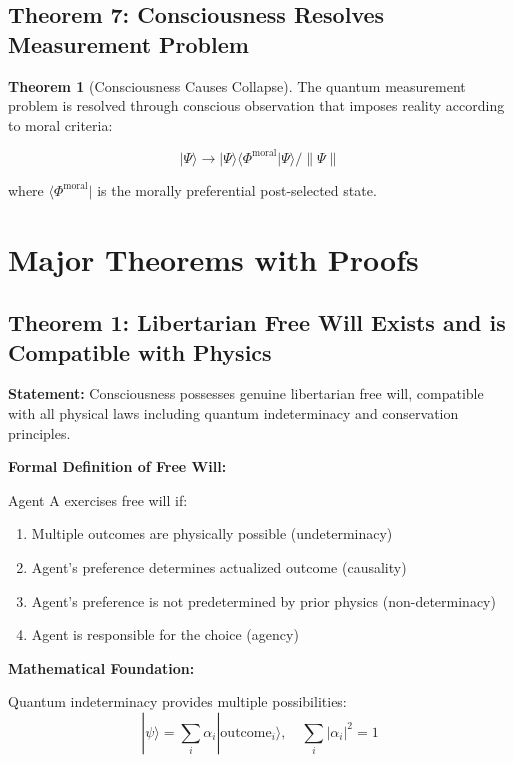 \documentclass[12pt,a4paper]{article}
\theoremstyle{definition}
\newtheorem{theorem}{Theorem}[section]
\begin{document}
\subsection{Theorem 7: Consciousness Resolves Measurement Problem}

\begin{theorem}[Consciousness Causes Collapse]
The quantum measurement problem is resolved through conscious observation that imposes reality according to moral criteria:

\begin{equation}
|\Psi\rangle \rightarrow |\Psi\rangle\langle\Phi^\text{moral}|\Psi\rangle / \| \Psi \|
\end{equation}

where $\langle\Phi^\text{moral}|$ is the morally preferential post-selected state.
\end{theorem}

\section{Major Theorems with Proofs}

\subsection{Theorem 1: Libertarian Free Will Exists and is Compatible with Physics}
{\bf Statement:} Consciousness possesses genuine libertarian free will, compatible with all physical laws including quantum indeterminacy and conservation principles.

{\bf Formal Definition of Free Will:}

Agent A exercises free will if:
\begin{enumerate}
    \item Multiple outcomes are physically possible (undeterminacy)
    \item Agent's preference determines actualized outcome (causality)
    \item Agent's preference is not predetermined by prior physics (non-determinacy)
    \item Agent is responsible for the choice (agency)
\end{enumerate}

{\bf Mathematical Foundation:}

Quantum indeterminacy provides multiple possibilities:
\begin{equation}
|\psi\rangle = \sum_i \alpha_i |\text{outcome}_i\rangle, \quad \sum_i |\alpha_i|^2 = 1
\end{equation}
\end{document}
